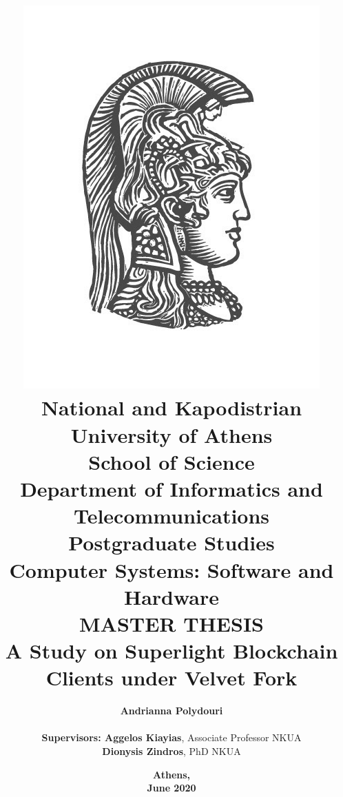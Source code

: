 \title{
    {\includegraphics[scale=0.8]{figures/logo_uoa.jpg}}\\
    {\Large \textbf{National and Kapodistrian University of Athens}} \\
    {\large \textbf{School of Science \\
    Department of Informatics and Telecommunications}}\\
    \vspace{0.4cm}
    \textbf{\large Postgraduate Studies}\\
    \textbf{\large Computer Systems: Software and Hardware}\\
    \vspace{10mm}
    {\Large \textbf{MASTER THESIS}}\\
    \vspace{3mm}
    {\textbf{\LARGE A Study on Superlight Blockchain Clients under Velvet Fork}}\\
    \vspace{0.8cm}
    }

\author{
    \textbf{Andrianna Polydouri} \\
    \vspace{0.8cm} \\
    \textbf{Supervisors: Aggelos Kiayias}, Associate Professor NKUA\\
    \hspace{0.35cm}
    \textbf{Dionysis Zindros}, PhD NKUA
    \vspace{0.7cm}
}

\date{\textbf{Athens, \\ June 2020}}
